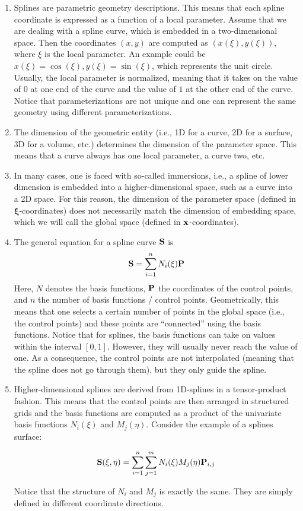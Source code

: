 \documentclass[11pt,a4paper]{article}
\begin{document}
\begin{enumerate}
\item Splines are parametric geometry descriptions. This means that each spline coordinate is expressed as a function of a local parameter. Assume that we are dealing with a spline curve, which is embedded in a two-dimensional space. Then the coordinates $(x,y)$ are computed as $(x(\xi), y(\xi))$, where $\xi$ is the local parameter. An example could be $x(\xi) = \cos(\xi), y(\xi) = \sin(\xi)$, which represents the unit circle. Usually, the local parameter is normalized, meaning that it takes on the value of $0$ at one end of the curve and the value of $1$ at the other end of the curve. Notice that parameterizations are not unique and one can represent the same geometry using different parameterizations.
\item The dimension of the geometric entity (i.e., 1D for a curve, 2D for a surface, 3D for a volume, etc.) determines the dimension of the parameter space. This means that a curve always has one local parameter, a curve two, etc.
\item In many cases, one is faced with so-called immersions, i.e., a spline of lower dimension is embedded into a higher-dimensional space, such as a curve into a 2D space. For this reason, the dimension of the parameter space (defined in $\boldsymbol{\xi}$-coordinates) does not necessarily match the dimension of embedding space, which we will call the global space (defined in ${\bf x}$-coordinates). 
\item The general equation for a spline curve $\bf S$ is 
\begin{equation}
    {\bf S} = \sum_{i=1}^n N_i(\xi) {\bf P}
\end{equation}
Here, $N$ denotes the basis functions, $\bf P$ the coordinates of the control points, and $n$ the number of basis functions / control points. Geometrically, this means that one selects a certain number of points in the global space (i.e., the control points) and these points are ``connected'' using the basis functions. Notice that for splines, the basis functions can take on values within the interval $[0,1]$. However, they will usually never reach the value of one. As a consequence, the control points are not interpolated (meaning that the spline does not go through them), but they only guide the spline. 
\item Higher-dimensional splines are derived from 1D-splines in a tensor-product fashion. This means that the control points are then arranged in structured grids and the basis functions are computed as a product of the univariate basis functions $N_i(\xi)$ and $M_j(\eta)$. Consider the example of a splines surface:

\begin{equation}
    {\bf S}(\xi, \eta) = \sum_{i=1}^n \sum_{j=1}^m N_i(\xi) M_j(\eta) {\bf P}_{i,j}
\end{equation}

Notice that the structure of $N_i$ and $M_j$ is exactly the same. They are simply defined in different coordinate directions.
\end{enumerate}
\end{document}

